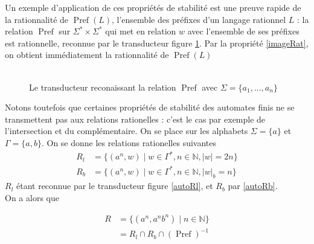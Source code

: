 \documentclass{scrartcl}
\begin{document}
\begin{flushleft}
Un exemple d'application de ces propriétés de stabilité est une preuve rapide de la rationnalité de $\operatorname*{Pref}(L)$, l'ensemble des préfixes
d'un langage rationnel $L$ : la relation $\operatorname*{Pref}$ sur $\Sigma^* \times \Sigma^*$ qui met en relation $w$ avec l'ensemble de
ses préfixes est rationnelle, reconnue par le transducteur figure \ref{transPref}. Par la propriété \ref{imageRat}, on obtient immédiatement la rationnalité de 
$\operatorname*{Pref}(L)$
\\~\\

\begin{figure}[h]
    \caption{Le transducteur reconaissant la relation $\operatorname*{Pref}$ avec $\Sigma = \{a_1, ..., a_n\}$} \label{transPref}
    \begin{center}
    \end{center}
\end{figure}

Notons toutefois que certaines propriétés de stabilité des automates finis ne se transmettent pas aux relations rationelles : c'est le cas par exemple
de l'intersection et du complémentaire. On se place sur les alphabets $\Sigma = \{a\}$ et $\Gamma = \{a, b\}$. On se donne les relations rationelles suivantes
\begin{equation*}
    \begin{split}
        R_{l} &= \{ (a^n, w) \mid w \in \Gamma^*, n \in \mathbb{N}, |w| = 2n \}\\
        R_{b} &= \{ (a^n, w) \mid w \in \Gamma^*, n \in \mathbb{N}, |w|_b = n \} 
    \end{split}
\end{equation*}
$R_l$ étant reconnue par le transducteur figure \ref{autoRl}, et $R_b$ par \ref{autoRb}.\\
On a alors que

\begin{align*}
    R &= \{ (a^n, a^n b^n) \mid n \in \mathbb{N} \}\\
    &= R_l \cap R_b \cap (\operatorname*{Pref})^{-1}
\end{align*}


\end{flushleft}
\end{document}

